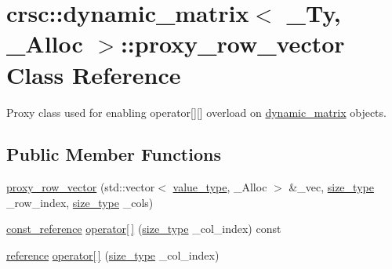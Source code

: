\hypertarget{classcrsc_1_1dynamic__matrix_1_1proxy__row__vector}{}\section{crsc\+:\+:dynamic\+\_\+matrix$<$ \+\_\+\+Ty, \+\_\+\+Alloc $>$\+:\+:proxy\+\_\+row\+\_\+vector Class Reference}
\label{classcrsc_1_1dynamic__matrix_1_1proxy__row__vector}


Proxy class used for enabling operator\mbox{[}\mbox{]}\mbox{[}\mbox{]} overload on \hyperlink{classcrsc_1_1dynamic__matrix}{dynamic\+\_\+matrix} objects.  


\subsection*{Public Member Functions}
\begin{DoxyCompactItemize}
\item 
\hyperlink{classcrsc_1_1dynamic__matrix_1_1proxy__row__vector_ae649b25900909bb59aba880a858b8faa}{proxy\+\_\+row\+\_\+vector} (std\+::vector$<$ \hyperlink{classcrsc_1_1dynamic__matrix_a27b83d28002e3e2bb316f1f0460e9cca}{value\+\_\+type}, \+\_\+\+Alloc $>$ \&\+\_\+vec, \hyperlink{classcrsc_1_1dynamic__matrix_a52b776dc7f60d8798c884d7d3c361a8a}{size\+\_\+type} \+\_\+row\+\_\+index, \hyperlink{classcrsc_1_1dynamic__matrix_a52b776dc7f60d8798c884d7d3c361a8a}{size\+\_\+type} \+\_\+cols)
\item 
\hyperlink{classcrsc_1_1dynamic__matrix_a93dd3386c16d60c4e8fb1e10b442fae0}{const\+\_\+reference} \hyperlink{classcrsc_1_1dynamic__matrix_1_1proxy__row__vector_a8dcf4071d58ca6277315621e31251880}{operator\mbox{[}$\,$\mbox{]}} (\hyperlink{classcrsc_1_1dynamic__matrix_a52b776dc7f60d8798c884d7d3c361a8a}{size\+\_\+type} \+\_\+col\+\_\+index) const 
\item 
\hyperlink{classcrsc_1_1dynamic__matrix_ad5dc61e01a1c64395f328ef851a5ffcf}{reference} \hyperlink{classcrsc_1_1dynamic__matrix_1_1proxy__row__vector_ade221ca8f9a56b92f24ae8ddae49dfe6}{operator\mbox{[}$\,$\mbox{]}} (\hyperlink{classcrsc_1_1dynamic__matrix_a52b776dc7f60d8798c884d7d3c361a8a}{size\+\_\+type} \+\_\+col\+\_\+index)
\end{DoxyCompactItemize}
